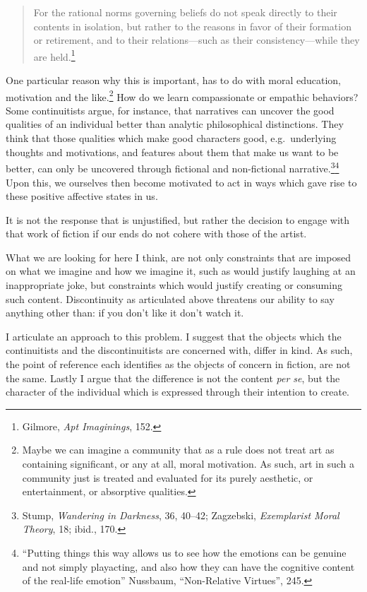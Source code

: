 \documentclass[phdthesis,12pt,final]{wuthesis}
\theoremstyle{definition}
\theoremstyle{definition}
\theoremstyle{definition}
\theoremstyle{definition}
\theoremstyle{remark}
\begin{document}
\begin{quote}
For the rational norms governing beliefs do not speak directly to their contents in isolation, but rather to the reasons in favor of their formation or retirement, and to their relations---such as their consistency---while they are held.\footnote{Gilmore, \emph{Apt {Imaginings}}, 152.}
\end{quote}

One particular reason why this is important, has to do with moral education, motivation and the like.\footnote{Maybe we can imagine a community that as a rule does not treat art as containing significant, or any at all, moral motivation. As such, art in such a community just is treated and evaluated for its purely aesthetic, or entertainment, or absorptive qualities.} How do we learn compassionate or empathic behaviors? Some continuitists argue, for instance, that narratives can uncover the good qualities of an individual better than analytic philosophical distinctions. They think that those qualities which make good characters good, e.g.~underlying thoughts and motivations, and features about them that make us want to be better, can only be uncovered through fictional and non-fictional narrative.\footnote{Stump, \emph{Wandering in {Darkness}}, 36, 40--42; Zagzebski, \emph{Exemplarist {Moral Theory}}, 18; ibid., 170.}\footnote{``Putting things this way allows us to see how the emotions can be genuine and not simply playacting, and also how they can have the cognitive content of the real-life emotion'' Nussbaum, {``Non-Relative Virtues''}, 245.} Upon this, we ourselves then become motivated to act in ways which gave rise to these positive affective states in us.

It is not the response that is unjustified, but rather the decision to engage with that work of fiction if our ends do not cohere with those of the artist.

What we are looking for here I think, are not only constraints that are imposed on what we imagine and how we imagine it, such as would justify laughing at an inappropriate joke, but constraints which would justify creating or consuming such content. Discontinuity as articulated above threatens our ability to say anything other than: if you don't like it don't watch it.

I articulate an approach to this problem. I suggest that the objects which the continuitists and the discontinuitists are concerned with, differ in kind. As such, the point of reference each identifies as the objects of concern in fiction, are not the same. Lastly I argue that the difference is not the content \emph{per se}, but the character of the individual which is expressed through their intention to create.
\end{document}
